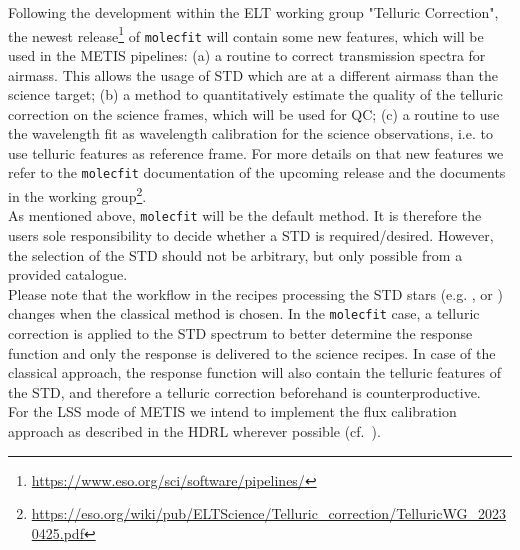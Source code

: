 Following the development within the \ac{ELT} working group "Telluric Correction", the newest release\footnote{\url{https://www.eso.org/sci/software/pipelines/}} of \texttt{molecfit} will contain some new features, which will be used in the \ac{METIS} pipelines: (a) a routine to correct transmission spectra for airmass. This allows the usage of \ac{STD} which are at a different airmass than the science target; (b) a method to quantitatively estimate the quality of the telluric correction on the science frames, which will be used for \ac{QC}; (c) a routine to use the wavelength fit as wavelength calibration for the science observations, i.e. to use telluric features as reference frame. For more details on that new features we refer to the \texttt{molecfit} documentation of the upcoming release and the documents in the working group\footnote{\url{https://eso.org/wiki/pub/ELTScience/Telluric_correction/TelluricWG_20230425.pdf}}.\\
As mentioned above, \texttt{molecfit} will be the default method. It is therefore the users sole responsibility to decide whether a \ac{STD} is required/desired. However, the selection of the \ac{STD} should not be arbitrary, but only possible from a provided catalogue.\\
Please note that the workflow in the recipes processing the \ac{STD} stars (e.g. ,  or ) changes when the classical method is chosen. In the \texttt{molecfit} case, a telluric correction is applied to the \ac{STD} spectrum to better determine the response function and only the response is delivered to the science recipes. In case of the classical approach, the response function will also contain the telluric features of the \ac{STD}, and therefore a telluric correction beforehand is counterproductive.\\
For the \ac{LSS} mode of \ac{METIS} we intend to implement the flux calibration approach as described in the \ac{HDRL} wherever possible (cf.~\cite{hdrl-manual}).\\ %


